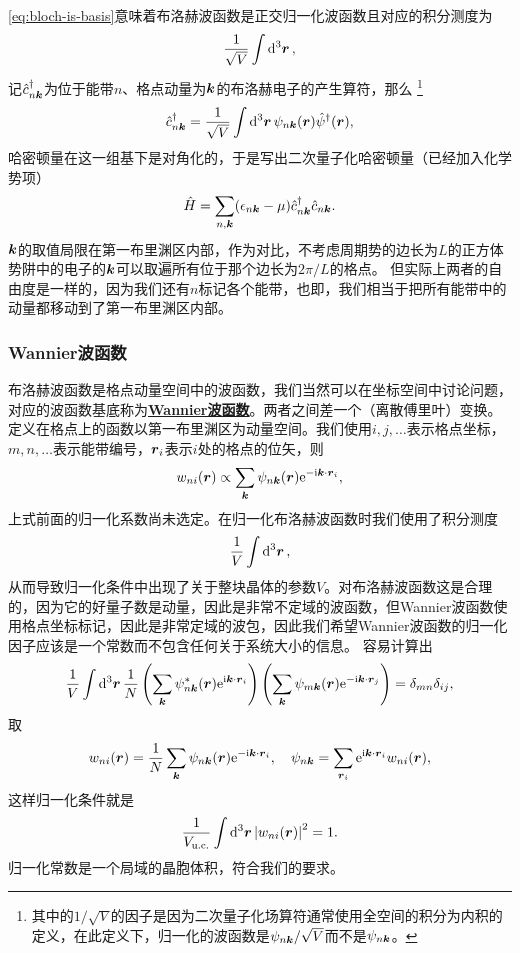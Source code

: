 \documentclass[hyperref, UTF8, a4paper]{ctexart}
\newcommand*{\ii}{\mathrm{i}}
\newcommand*{\ee}{\mathrm{e}}
\newcommand*{\concept}[1]{\underline{\textbf{#1}}}
\begin{document}
\eqref{eq:bloch-is-basis}意味着布洛赫波函数是正交归一化波函数且对应的积分测度为
\[
    \frac{1}{\sqrt{V}} \int \dd[3]{\vb*{r}},
\]
记$\hat{c}_{n\vb*{k}}^\dagger$为位于能带$n$、格点动量为$\vb*{k}$的布洛赫电子的产生算符，那么%
\footnote{其中的$1/\sqrt{V}$的因子是因为二次量子化场算符通常使用全空间的积分为内积的定义，在此定义下，归一化的波函数是$\psi_{n\vb*{k}} / \sqrt{V}$而不是$\psi_{n\vb*{k}}$。}%
\begin{equation}
    \hat{c}_{n \vb*{k}}^\dagger = \frac{1}{\sqrt{V}} \int \dd[3]{\vb*{r}} \psi_{n \vb*{k}}(\vb*{r}) \hat{\psi}^\dagger(\vb*{r}),
\end{equation}
哈密顿量在这一组基下是对角化的，于是写出二次量子化哈密顿量（已经加入化学势项）
\begin{equation}
    \hat{H} = \sum_{n, \vb*{k}} (\epsilon_{n\vb*{k}} - \mu) \hat{c}^\dagger_{n\vb*{k}} \hat{c}_{n\vb*{k}}.
    \label{eq:bloch-band-hamiltonian}
\end{equation}
$\vb*{k}$的取值局限在第一布里渊区内部，作为对比，不考虑周期势的边长为$L$的正方体势阱中的电子的$\vb*{k}$可以取遍所有位于那个边长为$2\pi / L$的格点。
但实际上两者的自由度是一样的，因为我们还有$n$标记各个能带，也即，我们相当于把所有能带中的动量都移动到了第一布里渊区内部。

\subsubsection{Wannier波函数}

布洛赫波函数是格点动量空间中的波函数，我们当然可以在坐标空间中讨论问题，对应的波函数基底称为\concept{Wannier波函数}。两者之间差一个（离散傅里叶）变换。
定义在格点上的函数以第一布里渊区为动量空间。我们使用$i, j, \ldots$表示格点坐标，$m, n, \ldots$表示能带编号，$\vb*{r}_i$表示$i$处的格点的位矢，则
\[
    w_{ni}(\vb*{r}) \propto \sum_{\vb*{k}} \psi_{n\vb*{k}}(\vb*{r}) \ee^{- \ii \vb*{k} \cdot \vb*{r}_i},
\]
上式前面的归一化系数尚未选定。在归一化布洛赫波函数时我们使用了积分测度
\[
    \frac{1}{V} \int \dd[3]{\vb*{r}},
\]
从而导致归一化条件中出现了关于整块晶体的参数$V$。对布洛赫波函数这是合理的，因为它的好量子数是动量，因此是非常不定域的波函数，但Wannier波函数使用格点坐标标记，因此是非常定域的波包，因此我们希望Wannier波函数的归一化因子应该是一个常数而不包含任何关于系统大小的信息。
容易计算出
\[
    \frac{1}{V} \int \dd[3]{\vb*{r}} \frac{1}{N} \left( \sum_{\vb*{k}} \psi^*_{n\vb*{k}}(\vb*{r}) \ee^{\ii \vb*{k} \cdot \vb*{r}_i} \right) \left( \sum_{\vb*{k}} \psi_{m\vb*{k}}(\vb*{r}) \ee^{- \ii \vb*{k} \cdot \vb*{r}_j} \right) = \delta_{mn} \delta_{ij},
\]
取
\begin{equation}
    w_{ni}(\vb*{r}) = \frac{1}{N} \sum_{\vb*{k}} \psi_{n\vb*{k}}(\vb*{r}) \ee^{-\ii \vb*{k} \cdot \vb*{r}_i}, \quad \psi_{n\vb*{k}} = \sum_{\vb*{r}_i} \ee^{\ii \vb*{k} \cdot \vb*{r}_i} w_{ni}(\vb*{r}),
\end{equation}
这样归一化条件就是
\begin{equation}
    \frac{1}{V_\text{u.c.}} \int \dd[3]{\vb*{r}} \abs{w_{ni}(\vb*{r})}^2 = 1.
\end{equation}
归一化常数是一个局域的晶胞体积，符合我们的要求。
\end{document}
